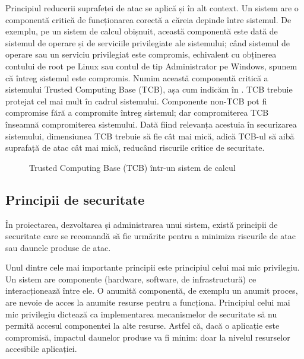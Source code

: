 Principiul reducerii suprafeței de atac se aplică și în alt context. Un sistem are o componentă critică de funcționarea corectă a căreia depinde între sistemul. De exemplu, pe un sistem de calcul obișnuit, această componentă este dată de sistemul de operare și de serviciile privilegiate ale sistemului; când sistemul de operare sau un serviciu privilegiat este compromis, echivalent cu obținerea contului de root pe Linux sau contul de tip Administrator pe Windows, spunem că întreg sistemul este compromis. Numim această componentă critică a sistemului Trusted Computing Base (TCB), așa cum indicăm în . TCB trebuie protejat cel mai mult în cadrul sistemului. Componente non-TCB pot fi compromise fără a compromite întreg sistemul; dar compromiterea TCB înseamnă compromiterea sistemului. Dată fiind relevanța acestuia în securizarea sistemului, dimensiunea TCB trebuie să fie cât mai mică, adică TCB-ul să aibă suprafață de atac cât mai mică, reducând riscurile critice de securitate.

\begin{figure}[htbp]
  \centering
  \def\svgwidth{\columnwidth}
  
  \caption{Trusted Computing Base (TCB) într-un sistem de calcul}
  \label{fig:sec:tcb}
\end{figure}

\subsection{Principii de securitate}
\label{sec:sec:principles}

În proiectarea, dezvoltarea și administrarea unui sistem, există principii de securitate care se recomandă să fie urmărite pentru a minimiza riscurile de atac sau daunele produse de atac.

Unul dintre cele mai importante principii este principiul celui mai mic privilegiu. Un sistem are componente (hardware, software, de infrastructură) ce interacționează între ele. O anumită componentă, de exemplu un anumit proces, are nevoie de acces la anumite resurse pentru a funcționa. Principiul celui mai mic privilegiu dictează ca implementarea mecanismelor de securitate să nu permită accesul componentei la alte resurse. Astfel că, dacă o aplicație este compromisă, impactul daunelor produse va fi minim: doar la nivelul resurselor accesibile aplicației.

